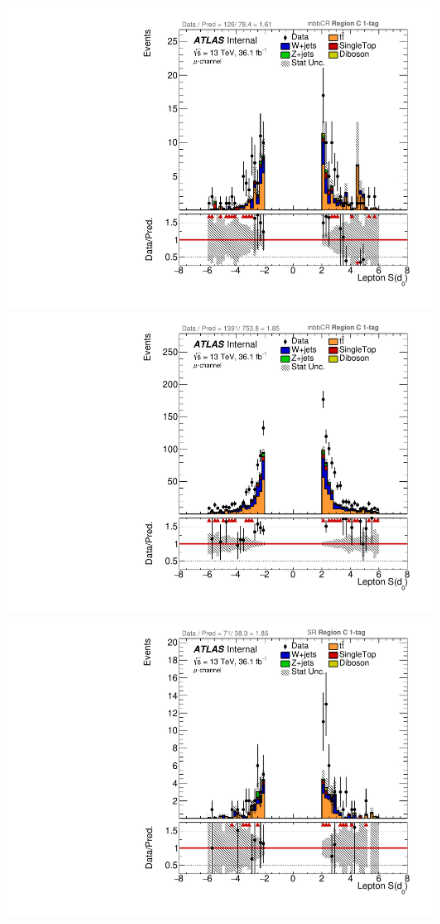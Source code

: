 \begin{figure}[!htbp]
\begin{center}
\includegraphics[scale=0.33]{./figures/boosted/ABCD/muon_mbbcr_RegionC_Lep_d0sigL}     
\includegraphics[scale=0.33]{./figures/boosted/ABCD/muon_mbbcr_RegionC_1tag_Lep_d0sigL} \\
\includegraphics[scale=0.33]{./figures/boosted/ABCD/muon_SR_RegionC_Lep_d0sigL}         

\end{center}
\end{figure}
